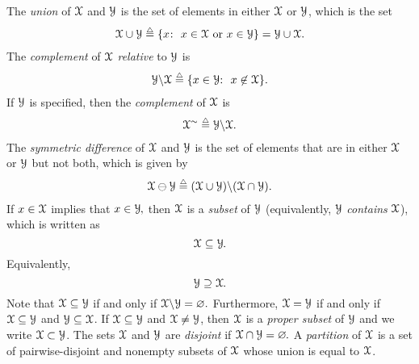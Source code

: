 \label{capsym}%
%
The {\it union} of ${\mathcal X} $ and ${\mathcal Y}$ is the set of
elements in either ${\mathcal X} $ or ${\mathcal Y}$, which is the set
%
%
\begin{align}\SX \cup \SY \isdef\{x\mspace{-1mu}\colon\ x\in \SX \mbox{ or } x\in \SY \}=\SY \cup
\SX.\end{align}
\label{cupsym}%
%
%
The {\it complement}
\label{backslashsym}%
%
%
of  ${\mathcal X}$ {\it relative} to ${\mathcal Y}$ is
%
\begin{align}\SY  \backslash\SX \isdef \{x \in \SY
\mspace{-2mu}\colon\ x \not\in \SX \}.\end{align}
%
\label{simsym}%
%
%
%
If  ${\mathcal Y}$ is specified, then the {\it complement} of ${\mathcal X}$ is
%
\begin{align}\SX^\sim \isdef \SY \backslash  \SX.\end{align}
%
The {\it symmetric difference}
%
of ${\mathcal X}$ and ${\mathcal Y}$ is the set of elements that are in either ${\mathcal X}$ or ${\mathcal Y}$ but not both, which is given by
%
\begin{align}
\SX\ominus \SY
%
\isdef (\SX \cup \SY)\backslash(\SX \cap \SY).
%
\end{align}
\label{symdiffsym}%
%
If $x\in {\mathcal X} $ implies that $x\in {\mathcal Y}\mspace{-1mu},$ then
%
${\mathcal X}$ is a {\it subset}
\label{subseteqsym}%
%
of ${\mathcal Y}$ (equivalently, ${\mathcal Y}$ {\it contains} ${\mathcal X}$), which is written as
%
%
\begin{equation}
{\mathcal X} \subseteq{\mathcal Y}\mspace{-1mu}.\end{equation}
%
Equivalently,
%
\begin{equation}
{\mathcal Y} \supseteq{\mathcal X}\mspace{-1mu}.\end{equation}
%
Note that ${\mathcal X} \subseteq{\mathcal Y}$ if and only if ${\mathcal X}\backslash{\mathcal Y}=\varnothing.$
%
Furthermore, ${\mathcal X} ={\mathcal Y}$ if and only if
${\mathcal X} \subseteq {\mathcal Y} $ and ${\mathcal Y} \subseteq {\mathcal X} $. If ${\mathcal X} \subseteq
{\mathcal Y} $ and ${\mathcal X} \not= {\mathcal Y} $, then ${\mathcal X}$ is a {\it proper subset}
\label{subsetneqsym}%
%
of ${\mathcal Y}$ and we write ${\mathcal X} \subset   {\mathcal Y} $.
%
The sets ${\mathcal X}$ and
${\mathcal Y}$ are {\it disjoint}
%
if ${\mathcal X} \cap {\mathcal Y} =\varnothing\mspace{-1mu}.$
%
A {\it partition}
%
of ${\mathcal X}$ is a set of pairwise-disjoint and nonempty subsets of ${\mathcal X}$
whose union is equal to ${\mathcal X}$.

